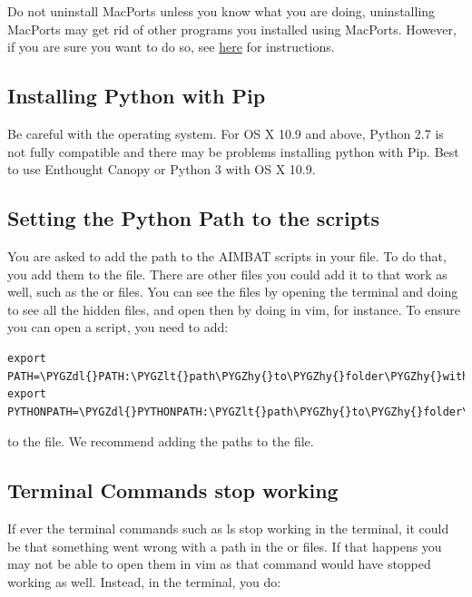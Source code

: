 \documentclass[letterpaper,10pt,english]{sphinxmanual}
\def\PYGZlt{\char`\<}
\def\PYGZgt{\char`\>}
\def\PYGZdl{\char`\$}
\def\PYGZhy{\char`\-}
\begin{document}
Do not uninstall MacPorts unless you know what you are doing, uninstalling MacPorts may get rid of other programs you installed using MacPorts. However, if you are sure you want to do so, see \href{https://guide.macports.org/chunked/installing.macports.uninstalling.html}{here} for instructions.


\subsection{Installing Python with Pip}
\label{docfiles/install_dependencies:installing-python-with-pip}
Be careful with the operating system. For OS X 10.9 and above, Python 2.7 is not fully compatible and there may be problems installing python with Pip. Best to use Enthought Canopy or Python 3 with OS X 10.9.


\subsection{Setting the Python Path to the scripts}
\label{docfiles/install_dependencies:setting-the-python-path-to-the-scripts}
You are asked to add the path to the AIMBAT scripts in your file. To do that, you add them to the  file. There are other files you could add it to that work as well, such as the  or  files. You can see the files by opening the terminal and doing  to see all the hidden files, and open then by doing  in vim, for instance.
To ensure you can open a script, you need to add:

\begin{Verbatim}[commandchars=\\\{\}]
export PATH=\PYGZdl{}PATH:\PYGZlt{}path\PYGZhy{}to\PYGZhy{}folder\PYGZhy{}with\PYGZhy{}scripts\PYGZgt{}
export PYTHONPATH=\PYGZdl{}PYTHONPATH:\PYGZlt{}path\PYGZhy{}to\PYGZhy{}folder\PYGZhy{}with\PYGZhy{}scripts\PYGZgt{}
\end{Verbatim}

to the  file. We recommend adding the paths to the  file.


\subsection{Terminal Commands stop working}
\label{docfiles/install_dependencies:terminal-commands-stop-working}
If ever the terminal commands such as ls stop working in the terminal, it could be that something went wrong with a path in the  or  files. If that happens you may not be able to open them in vim as that command would have stopped working as well. Instead, in the terminal, you do:
\end{document}

